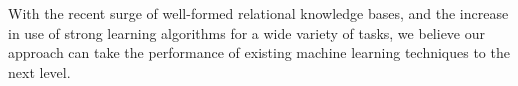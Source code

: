 \documentclass{article}
\theoremstyle{definition}
\begin{document}
With the recent surge of well-formed relational knowledge bases,
and the increase in use of strong learning algorithms for a wide variety of tasks,
we believe our approach can take the performance of existing machine learning techniques to the next level.

\clearpage


\end{document}
